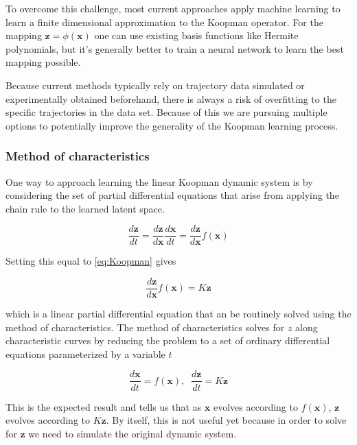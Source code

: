 \documentclass[12pt, letterpaper]{article}
\begin{document}
To overcome this challenge, most current approaches apply machine learning to learn a finite dimensional approximation to the Koopman operator.  For the mapping $\mathbf{z} = \phi(\mathbf{x})$ one can use existing basis functions like Hermite polynomials, but it's generally better to train a neural network to learn the best mapping possible.

Because current methods typically rely on trajectory data simulated or experimentally obtained beforehand, there is always a risk of overfitting to the specific trajectories in the data set.  Because of this we are pursuing multiple options to potentially improve the generality of the Koopman learning process.

\subsubsection{Method of characteristics}

One way to approach learning the linear Koopman dynamic system is by considering the set of partial differential equations that arise from applying the chain rule to the learned latent space.

\begin{equation}
    \frac{d \mathbf{z}}{dt} = \frac{d \mathbf{z}}{d \mathbf{x}} \frac{d \mathbf{x}}{dt} = \frac{d \mathbf{z}}{d \mathbf{x}} f(\mathbf{x})
\end{equation}

Setting this equal to \ref{eq:Koopman} gives

\begin{equation}
    \frac{d \mathbf{z}}{d \mathbf{x}} f(\mathbf{x}) = K \mathbf{z}
\end{equation}

which is a linear partial differential equation that an be routinely solved using the method of characteristics.  The method of characteristics solves for $z$ along characteristic curves by reducing the problem to a set of ordinary differential equations parameterized by a variable $t$

\begin{equation}
    \frac{d\mathbf{x}}{dt} = f(\mathbf{x}), \; \;
    \frac{d\mathbf{z}}{dt} = K \mathbf{z}
\end{equation}

This is the expected result and tells us that as $\mathbf{x}$ evolves according to $f(\mathbf{x})$, $\mathbf{z}$ evolves according to $K \mathbf{z}$.  By itself, this is not useful yet because in order to solve for $\mathbf{z}$ we need to simulate the original dynamic system.
\end{document}
